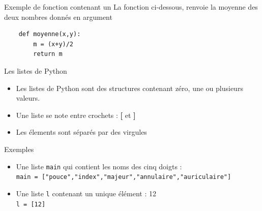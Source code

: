 \documentclass[10pt]{beamer}
\begin{document}
\begin{frame}[fragile]
	\mframe{\Python}
	\begin{exampleblock}{Exemple de fonction contenant un }
		La fonction ci-dessous, renvoie la moyenne des deux nombres donnés en argument
		\begin{lstlisting}
 	def moyenne(x,y):
		m = (x+y)/2
		return m
		\end{lstlisting}
	\end{exampleblock}
\end{frame}


\begin{frame}
	\mframe{\Python}
	\begin{center}
		\begin{alertblock}{Les listes de Python}
			\begin{itemize}
				\item<1-> Les listes de Python sont des structures contenant  zéro, une ou plusieurs valeurs.
				\item<2-> Une liste se note entre crochets : \textbf{[} et \textbf{]}
				\item<3-> Les élements sont séparés par des virgules
			\end{itemize}
		\end{alertblock}
		\begin{exampleblock}{Exemples}
			\begin{itemize}
				\item<4-> Une liste {\tt main} qui contient les noms des cinq doigts : \\
				      \onslide<5-> {\tt main = ["pouce","index","majeur","annulaire","auriculaire"]}
				\item<6-> Une liste {\tt l} contenant un unique élément : 12 \\
				      \onslide<5-> {\tt l = [12]}
			\end{itemize}
		\end{exampleblock}
	\end{center}
\end{frame}
\end{document}
